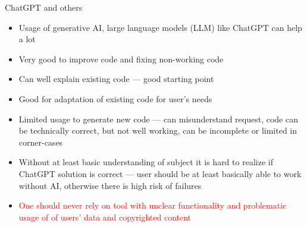 \documentclass[compress, xelatex, 11pt, xcolor=svgnames, aspectratio=169,
	hyperref={
		bookmarks=true,
		unicode=true,
		colorlinks=true,
		pdftitle={Linux, command line and MetaCentrum},
		plainpages=false,
		pdfauthor={Vojtech Zeisek},
		pdfsubject={Course about use of Linux command line, writing shell scripts and using MetaCentrum of CESNET},
		pdfcreator={XeLaTeX},
		pdfkeywords={Linux, GNU, BASH, shell, command line, MetaCentrum},
		linkcolor=DarkRed, %
		anchorcolor=DarkBlue, %
		citecolor=Indigo, %
		filecolor=NavyBlue, %
		menucolor=DarkMagenta, %
		urlcolor=DarkBlue, %
		},
	url={hyphens, lowtilde} %
	]{beamer}
\renewcommand{\alert}[1]{\textcolor{red}{#1}}
\begin{document}
\begin{frame}{ChatGPT and others}
	\begin{itemize}
		\item Usage of generative AI, large language models (LLM) like ChatGPT can help a lot
		\item Very good to improve code and fixing non-working code
		\item Can well explain existing code --- good starting point
		\item Good for adaptation of existing code for user's needs
		\item Limited usage to generate new code --- can misunderstand request, code can be technically correct, but not well working, can be incomplete or limited in corner-cases
		\item Without at least basic understanding of subject it is hard to realize if ChatGPT solution is correct --- user should be at least basically able to work without AI, otherwise there is high risk of failures
		\item \alert{One should never rely on tool with unclear functionality and problematic usage of of users' data and copyrighted content}
	\end{itemize}
\end{frame}
\end{document}
